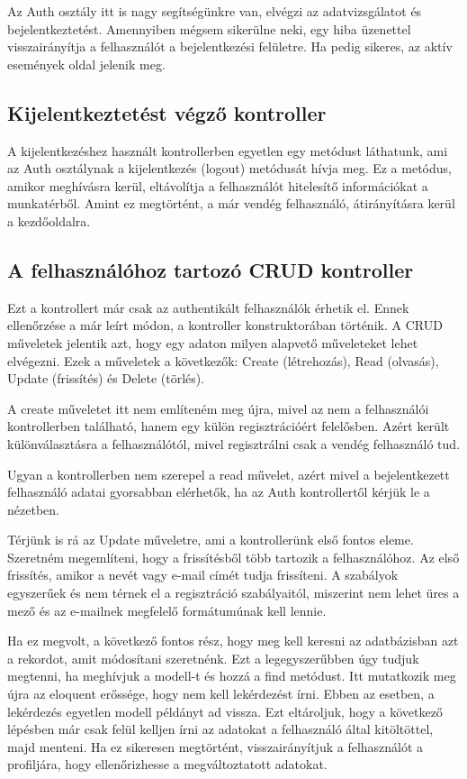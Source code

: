 \documentclass[
]{thesis-ekf}
\theoremstyle{definition}
\theoremstyle{remark}
\begin{document}
	Az Auth osztály itt is nagy segítségünkre van, elvégzi az adatvizsgálatot és bejelentkeztetést. Amennyiben mégsem sikerülne neki, egy hiba üzenettel visszairányítja a felhasználót a bejelentkezési felületre. Ha pedig sikeres, az aktív események oldal jelenik meg.
	
	\subsection{Kijelentkeztetést végző kontroller} 
	A kijelentkezéshez használt kontrollerben egyetlen egy metódust láthatunk, ami az Auth osztálynak a kijelentkezés (logout) metódusát hívja meg. Ez a metódus, amikor meghívásra kerül, eltávolítja a felhasználót hitelesítő információkat a munkatérből. Amint ez megtörtént, a már vendég felhasználó, átirányításra kerül a kezdőoldalra.
	
	\subsection{A felhasználóhoz tartozó CRUD kontroller}
	Ezt a kontrollert már csak az authentikált felhasználók érhetik el. Ennek ellenőrzése a már leírt módon, a kontroller konstruktorában történik. A CRUD műveletek jelentik azt, hogy egy adaton milyen alapvető műveleteket lehet elvégezni. Ezek a műveletek a következők: Create (létrehozás), Read (olvasás), Update (frissítés) és Delete (törlés). 
	
	A create műveletet itt nem említeném meg újra, mivel az nem a felhasználói kontrollerben található, hanem egy külön regisztrációért felelősben. Azért került különválasztásra a felhasználótól, mivel regisztrálni csak a vendég felhasználó tud. 
	
	Ugyan a kontrollerben nem szerepel a read művelet, azért mivel a bejelentkezett felhasználó adatai gyorsabban elérhetők, ha az Auth kontrollertől kérjük le a nézetben.
	
	Térjünk is rá az Update műveletre, ami a kontrollerünk első fontos eleme. Szeretném megemlíteni, hogy a frissítésből több tartozik a felhasználóhoz. Az első frissítés, amikor a nevét vagy e-mail címét tudja frissíteni. A szabályok egyszerűek és nem térnek el a regisztráció szabályaitól, miszerint nem lehet üres a mező és az e-mailnek megfelelő formátumúnak kell lennie.
	
	Ha ez megvolt, a következő fontos rész, hogy meg kell keresni az adatbázisban azt a rekordot, amit módosítani szeretnénk. Ezt a legegyszerűbben úgy tudjuk megtenni, ha meghívjuk a modell-t és hozzá a find metódust. Itt mutatkozik meg újra az eloquent erőssége, hogy nem kell lekérdezést írni. Ebben az esetben, a lekérdezés egyetlen modell példányt ad vissza. Ezt eltároljuk, hogy a következő lépésben már csak felül kelljen írni az adatokat a felhasználó által kitöltöttel, majd menteni. Ha ez sikeresen megtörtént, visszairányítjuk a felhasználót a profiljára, hogy ellenőrizhesse a megváltoztatott adatokat. 
	
\end{document}
